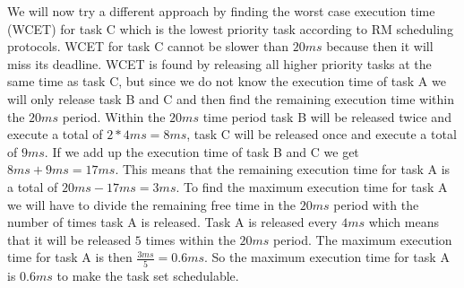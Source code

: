     We will now try a different approach by finding the worst case execution time (WCET) for task C which is the lowest priority task according to RM scheduling protocols. WCET for task C cannot be slower than $20ms$ because then it will miss its deadline. WCET is found by releasing all higher priority tasks at the same time as task C, but since we do not know the execution time of task A we will only release task B and C and then find the remaining execution time within the $20ms$ period. Within the $20ms$ time period task B will be released twice and execute a total of $2*4ms = 8ms$, task C will be released once and execute a total of $9ms$. If we add up the execution time of task B and C we get $8ms + 9ms = 17ms$. This means that the remaining execution time for task A is a total of $20ms - 17ms = 3ms$. To find the maximum execution time for task A we will have to divide the remaining free time in the $20ms$ period with the number of times task A is released. Task A is released every $4ms$ which means that it will be released $5$ times within the $20ms$ period. The maximum execution time for task A is then $\frac{3ms}{5} = 0.6ms$. So the maximum execution time for task A is $0.6ms$ to make the task set schedulable.\\

    

